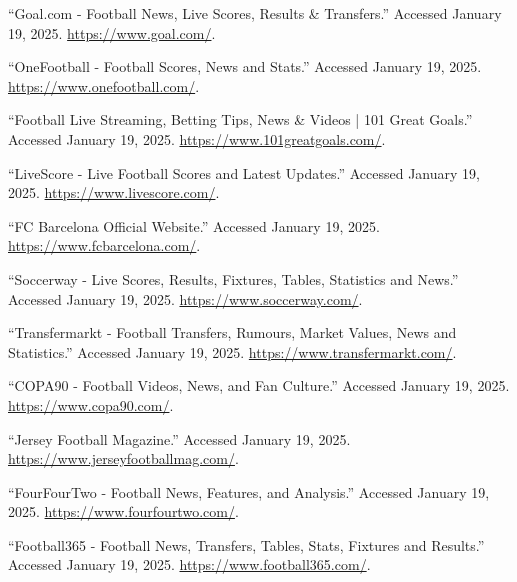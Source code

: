\documentclass{report}
\begin{document}
\begin{thebibliography}{24}
``Goal.com - Football News, Live Scores, Results & Transfers.'' Accessed January 19, 2025. \url{https://www.goal.com/}.

``OneFootball - Football Scores, News and Stats.'' Accessed January 19, 2025. \url{https://www.onefootball.com/}.

``Football Live Streaming, Betting Tips, News \& Videos | 101 Great Goals.'' Accessed January 19, 2025. \url{https://www.101greatgoals.com/}.

``LiveScore - Live Football Scores and Latest Updates.'' Accessed January 19, 2025. \url{https://www.livescore.com/}.

``FC Barcelona Official Website.'' Accessed January 19, 2025. \url{https://www.fcbarcelona.com/}.

``Soccerway - Live Scores, Results, Fixtures, Tables, Statistics and News.'' Accessed January 19, 2025. \url{https://www.soccerway.com/}.

``Transfermarkt - Football Transfers, Rumours, Market Values, News and Statistics.'' Accessed January 19, 2025. \url{https://www.transfermarkt.com/}.

``COPA90 - Football Videos, News, and Fan Culture.'' Accessed January 19, 2025. \url{https://www.copa90.com/}.

``Jersey Football Magazine.'' Accessed January 19, 2025. \url{https://www.jerseyfootballmag.com/}.

``FourFourTwo - Football News, Features, and Analysis.'' Accessed January 19, 2025. \url{https://www.fourfourtwo.com/}.


``Football365 - Football News, Transfers, Tables, Stats, Fixtures and Results.'' Accessed January 19, 2025. \url{https://www.football365.com/}.
\end{thebibliography}
\end{document}
